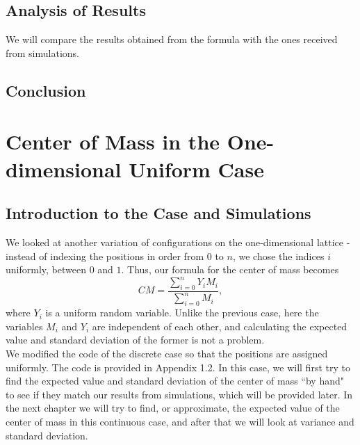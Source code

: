 \documentclass[11pt, twoside, reqno]{book}
\begin{document}
\section{Analysis of Results}
We will compare the results obtained from the formula with the ones received from simulations.
\label{secA5}

\section{Conclusion}
\label{secA6}

\chapter{Center of Mass in the One-dimensional Uniform Case}
\label{chapB}

\section{Introduction to the Case and Simulations}
\label{secB2}

We looked at another variation of configurations on the one-dimensional lattice - instead of indexing the positions in order from $0$ to $n$, we chose the indices $i$ uniformly, between $0$ and $1$. Thus, our formula for the center of mass becomes
$$CM = \frac{\sum^{n}_{i=0}Y_{i}M_{i}}{\sum^{n}_{i=0}M_{i}},$$
where $Y_{i}$ is a uniform random variable. Unlike the previous case, here the variables $M_{i}$ and $Y_{i}$ are independent of each other, and calculating the expected value and standard deviation of the former is not a problem. \\
We modified the code of the discrete case so that the positions are assigned uniformly. The code is provided in Appendix 1.2. In this case, we will first try to find the expected value and standard deviation of the center of mass ``by hand" to see if they match our results from simulations, which will be provided later. In the next chapter we will try to find, or approximate, the expected value of the center of mass in this continuous case, and after that we will look at variance and standard deviation.
\end{document}
